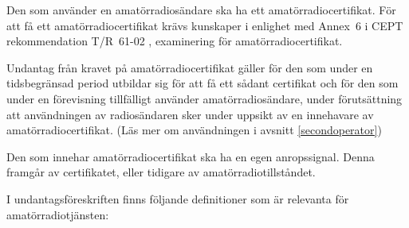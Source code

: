 Den som använder en amatörradiosändare ska ha ett amatörradiocertifikat.
För att få ett amatörradiocertifikat krävs kunskaper i enlighet med Annex~6 i
CEPT rekommendation T/R~61-02 \cite{TR6102}, examinering för
amatörradiocertifikat.

Undantag från kravet på amatörradiocertifikat gäller för den som under en
tidsbegränsad period utbildar sig för att få ett sådant certifikat och för
den som under en förevisning tillfälligt använder amatörradiosändare, under
förutsättning att användningen av radiosändaren sker under uppsikt av en
innehavare av amatörradiocertifikat.
(Läs mer om användningen i avsnitt \ref{secondoperator})


Den som innehar amatörradiocertifikat ska ha en egen anropssignal.
Denna framgår av certifikatet, eller tidigare av amatörradiotillståndet.

I undantagsföreskriften \cite{PTSFS2020:5} finns följande definitioner som är
relevanta för amatörradiotjänsten:

